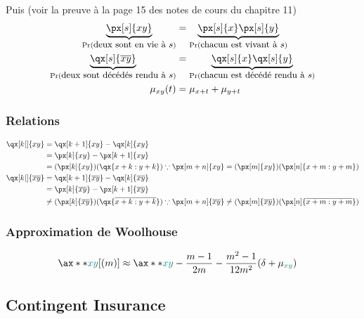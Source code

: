 \documentclass[10pt, french]{article}
\begin{document}
\begin{multicols*}{2}
Puis (voir la preuve à la page 15 des notes de cours du chapitre 11)
\begin{align*}
	\underbrace{\px[s]{xy}}_{\Pr(\small\shortstack{deux sont en vie à $s$})}
	&=	\underbrace{\px[s]{x}\px[s]{y}}_{\Pr(\small\shortstack{chacun est vivant à $s$})}		\\
	\underbrace{\qx[s]{\overline{xy}}}_{\Pr(\small\shortstack{deux sont décédés rendu à $s$})}
	&=	\underbrace{\qx[s]{x}\qx[s]{y}}_{\Pr(\small\shortstack{chacun est décédé rendu à $s$})}		\\
	\mu_{xy}(t)
	&=	\mu_{x + t} + \mu_{y + t}	
\end{align*}

\subsubsection*{Relations}
	\setlength{\mathindent}{-1cm}
\begin{align*}
	\qx[k|]{xy}
	&=	\qx[k + 1]{xy}	-	\qx[k]{xy}	\\
	&=	\px[k]{xy}	-	\px[k + 1]{xy}	\\
	&=	(\px[k]{xy})(\qx{x + k : y + k})		\because		\px[m + n]{xy} = (\px[m]{xy})(\px[n]{x + m : y + m})	\\
	\qx[k|]{\overline{xy}}
	&=	\qx[k + 1]{\overline{xy}}	-	\qx[k]{\overline{xy}}	\\
	&=	\px[k]{\overline{xy}}	-	\px[k + 1]{\overline{xy}}	\\
	&\neq	(\px[k]{\overline{xy}})(\qx{\overline{x + k : y + k}})	\because		\px[m + n]{\overline{xy}} \neq (\px[m]{\overline{xy}})(\px[n]{\overline{x + m : y + m}})	\\
\end{align*}
	\setlength{\mathindent}{1cm}

\subsubsection*{Approximation de Woolhouse}
\begin{align*}
	\ax**{\color{teal}xy}[(m)]
	&\approx	\ax**{\color{teal}xy}	-	\frac{m	-	1}{2m}	-	\frac{m^{2}	-	1}{12m^{2}}(\delta + \mu_{\color{teal}xy})	
\end{align*}

\columnbreak

\subsection*{Contingent Insurance}


\end{multicols*}
\end{document}
